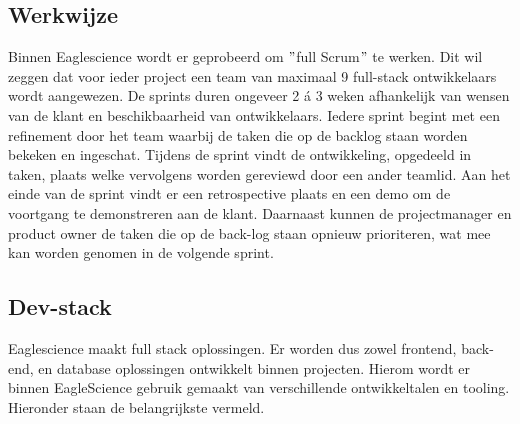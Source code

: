 \subsection{Werkwijze}\label{subsec:ESwerkwijze}
Binnen Eaglescience wordt er geprobeerd om $"$full Scrum$"$ te werken. Dit wil zeggen dat voor ieder project een team van maximaal 9 full-stack ontwikkelaars wordt aangewezen. De sprints duren ongeveer 2 á 3 weken afhankelijk van wensen van de klant en beschikbaarheid van ontwikkelaars. Iedere sprint begint met een refinement door het team waarbij de taken die op de backlog staan worden bekeken en ingeschat. Tijdens de sprint vindt de ontwikkeling, opgedeeld in taken, plaats welke vervolgens worden gereviewd door een ander teamlid. Aan het einde van de sprint vindt er een retrospective plaats en een demo om de voortgang te demonstreren aan de klant. Daarnaast kunnen de projectmanager en product owner de taken die op de back-log staan opnieuw prioriteren, wat mee kan worden genomen in de volgende sprint.

\subsection{Dev-stack}\label{subsec:ESdev-stack}
Eaglescience maakt full stack oplossingen. Er worden dus zowel frontend, back-end, en database oplossingen ontwikkelt binnen projecten. Hierom wordt er binnen EagleScience gebruik gemaakt van verschillende ontwikkeltalen en tooling. Hieronder staan de belangrijkste vermeld.


